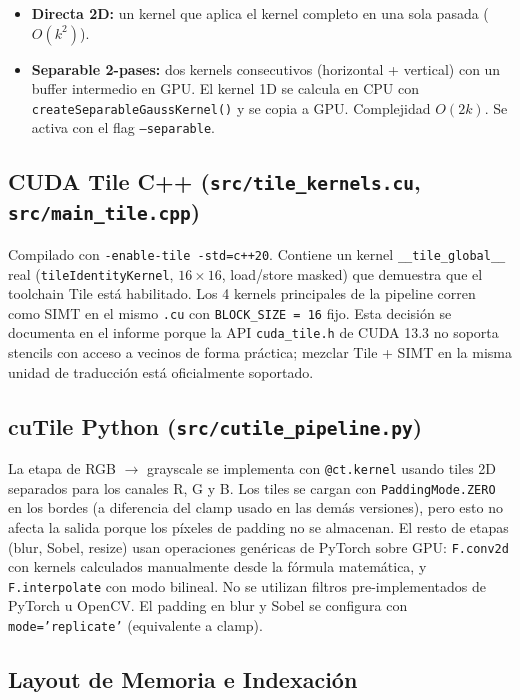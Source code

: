 \documentclass[12pt,a4paper]{article}
\begin{document}
\begin{itemize}
  \item \textbf{Directa 2D:} un kernel que aplica el kernel completo en una sola pasada ($O(k^2)$).
  \item \textbf{Separable 2-pases:} dos kernels consecutivos (horizontal + vertical) con un buffer intermedio en GPU. El kernel 1D se calcula en CPU con \texttt{createSeparableGaussKernel()} y se copia a GPU. Complejidad $O(2k)$. Se activa con el flag \texttt{--separable}.
\end{itemize}

\subsection{CUDA Tile C++ (\texttt{src/tile\_kernels.cu}, \texttt{src/main\_tile.cpp})}

Compilado con \texttt{-enable-tile -std=c++20}. Contiene un kernel \texttt{\_\_tile\_global\_\_} real (\texttt{tileIdentityKernel}, $16\times16$, load/store masked) que demuestra que el toolchain Tile est\'a habilitado. Los 4 kernels principales de la pipeline corren como SIMT en el mismo \texttt{.cu} con \texttt{BLOCK\_SIZE = 16} fijo. Esta decisi\'on se documenta en el informe porque la API \texttt{cuda\_tile.h} de CUDA 13.3 no soporta stencils con acceso a vecinos de forma pr\'actica; mezclar Tile + SIMT en la misma unidad de traducci\'on est\'a oficialmente soportado.

\subsection{cuTile Python (\texttt{src/cutile\_pipeline.py})}

La etapa de RGB $\rightarrow$ grayscale se implementa con \texttt{@ct.kernel} usando tiles 2D separados para los canales R, G y B. Los tiles se cargan con \texttt{PaddingMode.ZERO} en los bordes (a diferencia del clamp usado en las dem\'as versiones), pero esto no afecta la salida porque los p\'ixeles de padding no se almacenan. El resto de etapas (blur, Sobel, resize) usan operaciones gen\'ericas de PyTorch sobre GPU: \texttt{F.conv2d} con kernels calculados manualmente desde la f\'ormula matem\'atica, y \texttt{F.interpolate} con modo bilineal. No se utilizan filtros pre-implementados de PyTorch u OpenCV. El padding en blur y Sobel se configura con \texttt{mode='replicate'} (equivalente a clamp).

\subsection{Layout de Memoria e Indexaci\'on}
\end{document}
